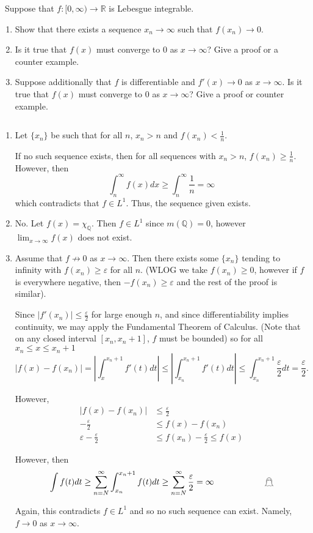 \documentclass[12pt]{Qual}
\begin{document}
\begin{problem} $\,$
Suppose that $f:[0,\infty)\to\mathbb{R}$ is Lebesgue integrable.
\begin{enumerate}[label=(\alph*)]
    \item Show that there exists a sequence $x_n\to\infty$ such that $f(x_n)\to0$.
    \item Is it true that $f(x)$ must converge to $0$ as $x\to\infty$? Give a proof or a counter example.
    \item Suppose additionally that $f$ is differentiable and $f'(x)\to0$ as $x\to\infty$. Is it true that $f(x)$ must converge to $0$ as $x\to\infty$? Give a proof or counter example.
\end{enumerate}
\end{problem}


\begin{solution}$\,$
\begin{enumerate}[label=(\alph*)]
    \item Let $\{x_n\}$ be such that for all $n$, $x_n>n$ and $f(x_n)<\frac{1}{n}$.

    If no such sequence exists, then for all sequences with $x_n>n$, $f(x_n)\ge\frac{1}{n}$. However, then $$\int_n^\infty f(x)dx\ge\int_n^\infty\frac{1}{n}=\infty$$ which contradicts that $f\in L^1$. Thus, the sequence given exists.
    \item No. Let $f(x)=\chi_\mathbb{Q}$. Then $f\in L^1$ since $m(\mathbb{Q})=0$, however $\lim_{x\to\infty} f(x)$ does not exist.
    \item Assume that $f\not\to 0$ as $x\to\infty$. Then there exists some $\{x_n\}$ tending to infinity with $f(x_n)\ge\varepsilon$ for all $n$. (WLOG we take $f(x_n)\ge0$, however if $f$ is everywhere negative, then $-f(x_n)\ge\varepsilon$ and the rest of the proof is similar).

    Since $|f'(x_n)|\le \frac{\varepsilon}{2}$ for large enough $n$, and since differentiability implies continuity, we may apply the Fundamental Theorem of Calculus. (Note that on any closed interval $[x_n,x_n+1]$, $f$ must be bounded) so for all $x_n\le x\le x_n+1$ $$|f(x)-f(x_n)|=\left|\int_{x}^{x_n+1}f'(t)dt\right|\le\left|\int_{x_n}^{x_n+1}f'(t)dt\right|\le\int_{x_n}^{x_n+1}\frac{\varepsilon}{2} dt=\frac{\varepsilon}{2}.$$

    However, \begin{align*}
        |f(x)-f(x_n)|&\le\frac{\varepsilon}{2}\\
        -\frac{\varepsilon}{2}&\le f(x)-f(x_n)\\
      \varepsilon-\frac{\varepsilon}{2}&\le f(x_n)-\frac{\varepsilon}{2}\le f(x)
    \end{align*}

    However, then $$\int f(t)dt\ge \sum_{n=N}^\infty\int_{x_n}^{x_n+1}f(t)dt\ge\sum_{n=N}^\infty\frac{\varepsilon}{2}=\infty\qquad\qquad\qquad\text{\contradiction}$$

    Again, this contradicts $f\in L^1$ and so no such sequence can exist. Namely, $f\to0$ as $x\to\infty$.
\end{enumerate}
\end{solution}
\newpage
\end{document}
